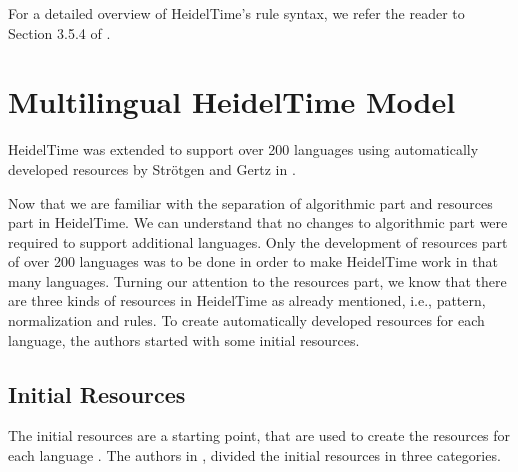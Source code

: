 For a detailed overview of HeidelTime's rule syntax, we refer the reader to Section 3.5.4 of \cite{DBLP:phd/de/Strotgen15}.

\section{Multilingual HeidelTime Model} \label{multilingual-ht-model}
HeidelTime was extended to support over 200 languages using automatically developed resources by Str\"{o}tgen and Gertz in \cite{DBLP:conf/emnlp/StrotgenG15}. 

Now that we are familiar with the separation of algorithmic part and resources part in HeidelTime. We can understand that no changes to algorithmic part were required to support additional languages. Only the development of resources part of over 200 languages was to be done in order to make HeidelTime work in that many languages. Turning our attention to the resources part, we know that there are three kinds of resources in HeidelTime as already mentioned, i.e., pattern, normalization and rules. To create automatically developed resources for each language, the authors started with some initial resources. 

\subsection{Initial Resources} \label{res-ir}
The initial resources are a starting point, that are used to create the resources for each language . The authors in \cite{DBLP:conf/emnlp/StrotgenG15}, divided the initial resources in three categories. 

